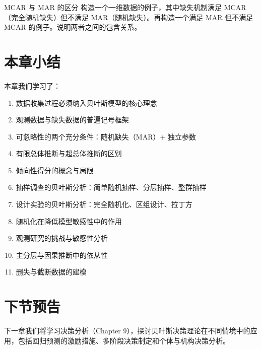 \begin{Exercise}{MCAR 与 MAR 的区分}
构造一个一维数据的例子，其中缺失机制满足 MCAR（完全随机缺失）但不满足 MAR（随机缺失）。再构造一个满足 MAR 但不满足 MCAR 的例子。说明两者之间的包含关系。
\end{Exercise}

\section{本章小结}

本章我们学习了：
\begin{enumerate}
  \item 数据收集过程必须纳入贝叶斯模型的核心理念
  \item 观测数据与缺失数据的普遍记号框架
  \item 可忽略性的两个充分条件：随机缺失（MAR）+ 独立参数
  \item 有限总体推断与超总体推断的区别
  \item 倾向性得分的概念与局限
  \item 抽样调查的贝叶斯分析：简单随机抽样、分层抽样、整群抽样
  \item 设计实验的贝叶斯分析：完全随机化、区组设计、拉丁方
  \item 随机化在降低模型敏感性中的作用
  \item 观测研究的挑战与敏感性分析
  \item 主分层与因果推断中的依从性
  \item 删失与截断数据的建模
\end{enumerate}

\section{下节预告}

下一章我们将学习决策分析（Chapter 9），探讨贝叶斯决策理论在不同情境中的应用，包括回归预测的激励措施、多阶段决策制定和个体与机构决策分析。

\endinput
